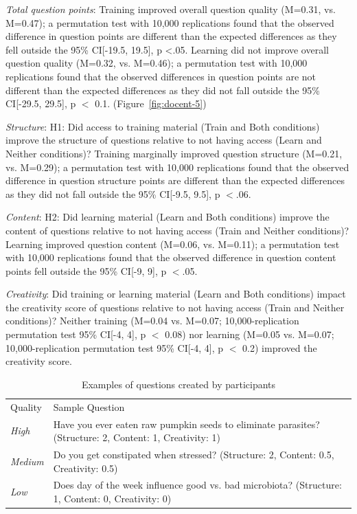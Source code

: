 \textit{Total question points}: Training improved overall question quality (M=0.31, vs. M=0.47); a permutation test with 10,000 replications found that the observed difference in question points are different than the expected differences as they fell outside the 95\% CI[-19.5, 19.5], p <.05. Learning did not improve overall question quality (M=0.32, vs. M=0.46); a permutation test with 10,000 replications found that the observed differences in question points are not different than the expected differences as they did not fall outside the 95\% CI[-29.5, 29.5], p $<$ 0.1. (Figure~\ref{fig:docent-5})

\textit{Structure}: H1: Did access to training material (Train and Both conditions) improve the structure of questions relative to not having access (Learn and Neither conditions)? Training marginally improved question structure (M=0.21, vs. M=0.29); a permutation test with 10,000 replications found that the observed difference in question structure points are different than the expected differences as they did not fall outside the 95\% CI[-9.5, 9.5], p $<$.06.

\textit{Content}: H2: Did learning material (Learn and Both conditions) improve the content of questions relative to not having access (Train and Neither conditions)? Learning improved question content (M=0.06, vs. M=0.11); a permutation test with 10,000 replications found that the observed difference in question content points fell outside the 95\% CI[-9, 9], p $<$.05.

\textit{Creativity}: Did training or learning material (Learn and Both conditions) impact the creativity score of questions relative to not having access (Train and Neither conditions)? Neither training (M=0.04 vs. M=0.07; 10,000-replication permutation test 95\% CI[-4, 4], p $<$ 0.08) nor learning (M=0.05 vs. M=0.07; 10,000-replication permutation test 95\% CI[-4, 4], p $<$ 0.2) improved the creativity score.

\vspace{0.25in}
\begin{table}[!ht]
\caption[Examples of questions created by participants]
{Examples of questions created by participants}

\vspace{-0.25in}
\begin{center}
\renewcommand{\arraystretch}{1.5}
\begin{tabular}{p{1in}p{4.5in}}
\hline
Quality & Sample Question \\
\textit{High} 		& Have you ever eaten raw pumpkin seeds to eliminate parasites? (Structure: 2, Content: 1, Creativity: 1) \\

\textit{Medium} 	& Do you get constipated when stressed? (Structure: 2, Content: 0.5, Creativity: 0.5) \\

\textit{Low} 		& Does day of the week influence good vs. bad microbiota? (Structure: 1, Content: 0, Creativity: 0) \\
\hline
\end{tabular}
\end{center}
\label{d-tab:results2}
\end{table}

